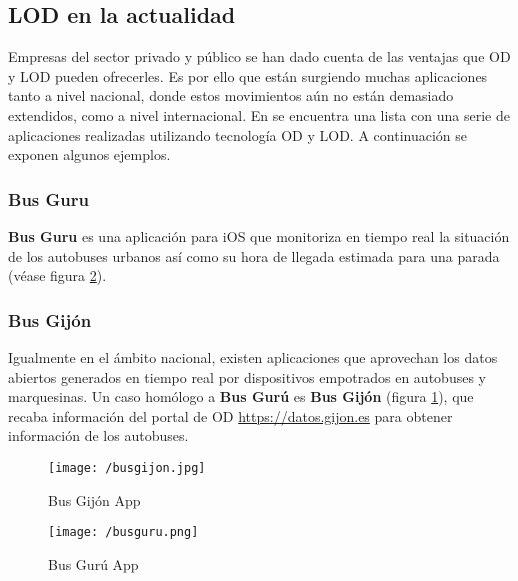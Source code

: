 \subsection{\acs{LOD} en la actualidad}

Empresas del sector privado y público se han dado cuenta de las ventajas que
\acs{OD} y \acs{LOD} pueden ofrecerles. Es por ello que están surgiendo muchas
aplicaciones tanto a nivel nacional, donde estos movimientos aún no están
demasiado extendidos, como a nivel internacional. En \cite{APPS} se encuentra
una lista con una serie de aplicaciones realizadas utilizando tecnología
\acs{OD} y \acs{LOD}. A continuación se exponen algunos ejemplos. 


\subsubsection{Bus Guru}

\textbf{Bus Guru} es una aplicación para iOS que monitoriza en tiempo real la
situación de los autobuses urbanos así como su hora de llegada estimada para una
parada (véase figura \ref{fig:busguruapp}). 

\subsubsection{Bus Gijón}

Igualmente en el ámbito nacional, existen aplicaciones que aprovechan los datos
abiertos generados en tiempo real por dispositivos empotrados en autobuses y
marquesinas. Un caso homólogo a \textbf{Bus Gurú} es \textbf{Bus Gijón} (figura \ref{fig:busgijon}), que
recaba información del portal de \acs{OD} \url{https://datos.gijon.es} para
obtener información de los autobuses. 


\begin{figure}[!h]
  \begin{center}
    \texttt{[image: /busgijon.jpg]} 
    \caption{Bus Gijón App}
    \label{fig:busgijon}
  \end{center}
\end{figure}


\begin{figure}[!h]
  \begin{center}
    \texttt{[image: /busguru.png]} 
    \caption{Bus Gurú App}
    \label{fig:busguruapp}
  \end{center}
\end{figure}




